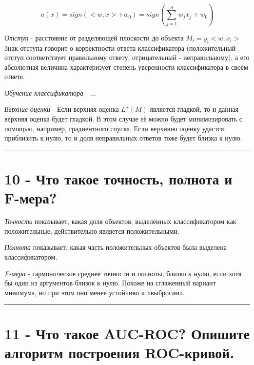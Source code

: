 \documentclass[11pt]{article}
\begin{document}
\[a(x) = sign (<w, x> + w_0) = sign(\sum_{j=1}^dw_jx_j + w_0)\]

\emph{Отступ} - расстояние от разделяющей плоскости до объекта
\(M_i = y_i<w, x_i>\) Знак отступа говорит о корректности ответа
классификатора (положительный отступ соответствует правильному ответу,
отрицательный - неправильному), а его абсолютная величина характеризует
степень уверенности классификатора в своём ответе.

\emph{Обучение классификатора} - ...

\emph{Верхние оценки} - Если верхняя оценка \(L˜(M)\) является гладкой,
то и данная верхняя оценка будет гладкой. В этом случае её можно будет
минимизировать с помощью, например, градиентного спуска. Если верхнюю
оценку удастся приблизить к нулю, то и доля неправильных ответов тоже
будет близка к нулю.

    \begin{center}\rule{0.5\linewidth}{\linethickness}\end{center}

    \section{10 - Что такое точность, полнота и
F-мера?}\label{ux447ux442ux43e-ux442ux430ux43aux43eux435-ux442ux43eux447ux43dux43eux441ux442ux44c-ux43fux43eux43bux43dux43eux442ux430-ux438-f-ux43cux435ux440ux430}

\emph{Точность} показывает, какая доля объектов, выделенных
классификатором как положительные, действительно является
положительными.

\emph{Полнота} показывает, какая часть положительных объектов была
выделена классификатором.

\emph{F-мера} - гармоническое среднее точности и полноты, близко к нулю,
если хотя бы один из аргументов близок к нулю. Похоже на сглаженный
вариант минимума, но при этом оно менее устойчиво к «выбросам».

    \begin{center}\rule{0.5\linewidth}{\linethickness}\end{center}

    \section{11 - Что такое AUC-ROC? Опишите алгоритм построения
ROC-кривой.}\label{ux447ux442ux43e-ux442ux430ux43aux43eux435-auc-roc-ux43eux43fux438ux448ux438ux442ux435-ux430ux43bux433ux43eux440ux438ux442ux43c-ux43fux43eux441ux442ux440ux43eux435ux43dux438ux44f-roc-ux43aux440ux438ux432ux43eux439.}
\end{document}
